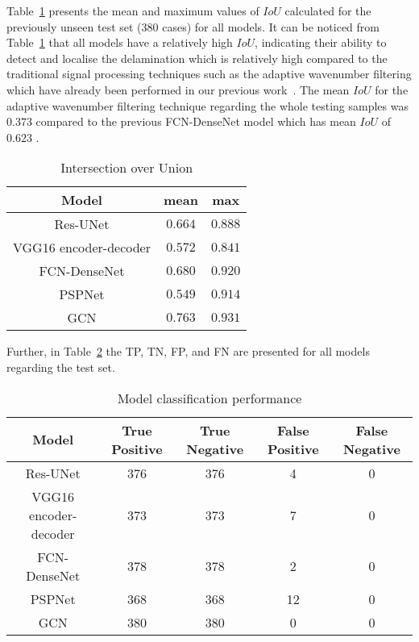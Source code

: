 \clearpage
Table~\ref{tab:table_iou} presents the mean and maximum values of \(IoU\) calculated for the previously unseen test set (380 cases) for all models.
It can be noticed from Table~\ref{tab:table_iou}  that all models have a relatively high \(IoU\), indicating their ability to detect and localise the delamination which is relatively high compared to the traditional signal processing techniques such as the adaptive wavenumber filtering which have already been performed in our previous work~\cite{Ijjeh2021}. 
The mean \(IoU\) for the adaptive wavenumber filtering technique regarding the whole testing samples was \(0.373\) compared to the previous FCN-DenseNet model which has mean \(IoU\) of \(0.623\) .
\begin{table}[]
	\centering
	\caption{Intersection over Union}
	\label{tab:table_iou}
	\begin{tabular}{ccc}\hline
		Model & mean & max \\ \hline
		Res-UNet & \(0.664\) & \(0.888\) \\ 
		VGG16 encoder-decoder & \(0.572\) & \(0.841\) \\ 
		FCN-DenseNet & \(0.680\) & \(0.920\) \\ 
		PSPNet & \(0.549\) & \(0.914\) \\ 
		GCN & \(0.763\) & \(0.931\) \\ \hline
	\end{tabular}
\end{table}
Further, in Table~\ref{tab:table_performance} the TP, TN, FP, and FN are presented for all models regarding the test set. 
\begin{table}[]
	\centering
	\caption{Model classification performance}
	\label{tab:table_performance}
	\resizebox{\textwidth}{!}
	{
		\begin{tabular}{ccccc} \hline
			Model& True Positive & True Negative & False Positive & False Negative \\ \hline
			Res-UNet & 376 & 376 & 4 & 0 \\ 
			VGG16 encoder-decoder & 373 & 373 & 7 & 0 \\ 
			FCN-DenseNet & 378 & 378 & 2 & 0 \\ 
			PSPNet & 368 & 368 & 12 & 0 \\ 
			GCN & 380 & 380 & 0 & 0 \\ \hline
		\end{tabular}
	}
\end{table}
